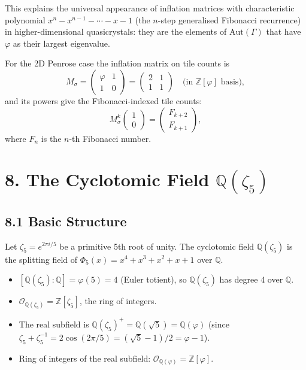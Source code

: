 This explains the universal appearance of
inflation matrices with characteristic polynomial
\(x^n - x^{n-1} - \cdots - x - 1\) (the \(n\)-step
generalised Fibonacci recurrence) in higher-dimensional
quasicrystals: they are the elements of
\(\mathrm{Aut}(\Gamma)\) that have
\(\varphi\) as their largest eigenvalue.

For the 2D Penrose case the inflation matrix on
tile counts is
\[
  M_\sigma = \begin{pmatrix} \varphi & 1 \\ 1 & 0 \end{pmatrix}
           = \begin{pmatrix} 2 & 1 \\ 1 & 1 \end{pmatrix}
             \quad \text{(in } \mathbb{Z}[\varphi] \text{ basis)},
\]
and its powers give the Fibonacci-indexed tile
counts:
\[
  M_\sigma^k \begin{pmatrix} 1 \\ 0 \end{pmatrix}
    = \begin{pmatrix} F_{k+2} \\ F_{k+1} \end{pmatrix},
\]
where \(F_n\) is the \(n\)-th Fibonacci number.

\section{8. The Cyclotomic Field
\texorpdfstring{$\mathbb{Q}(\zeta_5)$}{Q(zeta5)}}\label{sec:cyclotomic}

\subsection{8.1 Basic Structure}\label{sec:cyc-basic}

Let \(\zeta_5 = e^{2\pi i/5}\) be a primitive
5th root of unity. The cyclotomic field
\(\mathbb{Q}(\zeta_5)\) is the splitting field
of \(\Phi_5(x) = x^4 + x^3 + x^2 + x + 1\)
over \(\mathbb{Q}\).

\begin{itemize}
  \item \([\mathbb{Q}(\zeta_5) : \mathbb{Q}] = \varphi(5) = 4\)
        (Euler totient), so \(\mathbb{Q}(\zeta_5)\)
        has degree 4 over \(\mathbb{Q}\).
  \item \(\mathcal{O}_{\mathbb{Q}(\zeta_5)}
        = \mathbb{Z}[\zeta_5]\), the ring of
        integers.
  \item The real subfield is
        \(\mathbb{Q}(\zeta_5)^+ = \mathbb{Q}(\sqrt{5})
        = \mathbb{Q}(\varphi)\) (since
        \(\zeta_5 + \zeta_5^{-1} = 2\cos(2\pi/5)
        = (\sqrt{5}-1)/2 = \varphi - 1\)).
  \item Ring of integers of the real subfield:
        \(\mathcal{O}_{\mathbb{Q}(\varphi)}
        = \mathbb{Z}[\varphi]\).
\end{itemize}

